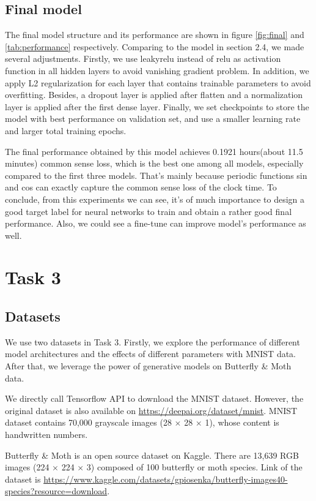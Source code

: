\documentclass{article}
\begin{document}
\subsection{Final model}

The final model structure and its performance are shown in figure \ref{fig:final} and \ref{tab:performance} respectively. Comparing to the model in section 2.4, we made several adjustments. Firstly, we use leakyrelu instead of relu as activation function in all hidden layers to avoid vanishing gradient problem. In addition, we apply L2 regularization for each layer that contains trainable parameters to avoid overfitting. Besides, a dropout layer is applied after flatten and a normalization layer is applied after the first dense layer. Finally, we set checkpoints to store the model with best performance on validation set, and use a smaller learning rate and larger total training epochs.

The final performance obtained by this model achieves 0.1921 hours(about 11.5 minutes) common sense loss, which is the best one among all models, especially compared to the first three models. That's mainly because periodic functions sin and cos can exactly capture the common sense loss of the clock time. To conclude, from this experiments we can see, it's of much importance to design a good target label for neural networks to train and obtain a rather good final performance. Also, we could see a fine-tune can improve model's performance as well.
\section*{Task 3}
\setcounter{section}{3}
\setcounter{subsection}{0}
\subsection{Datasets}
We use two datasets in Task 3. Firstly, we explore the performance of different model architectures and the effects of different parameters with MNIST data. After that, we leverage the power of generative models on Butterfly \& Moth data. \par
We directly call Tensorflow API to download the MNIST dataset. However, the original dataset is also available on \url{https://deepai.org/dataset/mnist}. MNIST dataset contains 70,000 grayscale images (28 $\times$ 28 $\times$ 1), whose content is handwritten numbers. \par
Butterfly \& Moth is an open source dataset on Kaggle. There are 13,639 RGB images (224 $\times$ 224 $\times$ 3) composed of 100 butterfly or moth species. Link of the dataset is \url{https://www.kaggle.com/datasets/gpiosenka/butterfly-images40-species?resource=download}.
\end{document}
